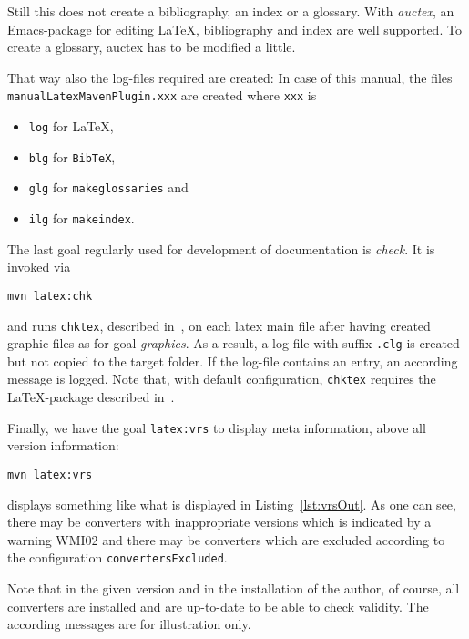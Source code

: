 Still this does not create a bibliography, an index or a glossary. 
With {\em auctex\/}, an Emacs-package for editing \LaTeX, 
bibliography and index are well supported. 
To create a glossary, auctex has to be modified a little. 


That way also the log-files required are created: 
In case of this manual, 
the files \texttt{manualLatexMavenPlugin.xxx} are created 
where \texttt{xxx} is 
%
\begin{itemize}
\item
\texttt{log} for \LaTeX, 
\item
\texttt{blg} for \texttt{BibTeX}, 
\item
\texttt{glg} for \texttt{makeglossaries} and 
\item
\texttt{ilg} for \texttt{makeindex}. 
\end{itemize}

The last goal regularly used for development of documentation is {\em check}. 
It is invoked via 
% 
\begin{Verbatim}
mvn latex:chk
\end{Verbatim}
%
and runs \texttt{chktex}, described in~\cite{ChkTeX}, 
on each latex main file 
after having created graphic files as for goal {\em graphics}. 
As a result, a log-file with suffix \texttt{.clg} is created 
but not copied to the target folder. 
If the log-file contains an entry, 
an according message is logged. 
Note that, with default configuration, 
\texttt{chktex} requires the \LaTeX-package  
described in~\cite{BooktP}. 


Finally, we have the goal \texttt{latex:vrs}
to display meta information, above all version information:
% 
\begin{Verbatim}
mvn latex:vrs
\end{Verbatim}
%
displays something like what is displayed in Listing~\ref{lst:vrsOut}.
As one can see, there may be converters with inappropriate versions
which is indicated by a warning WMI02 
and there may be converters which are excluded
according to the configuration \texttt{convertersExcluded}.

Note that in the given version and in the installation of the author,
of course, all converters are installed and are up-to-date
to be able to check validity.
The according messages are for illustration only. 


